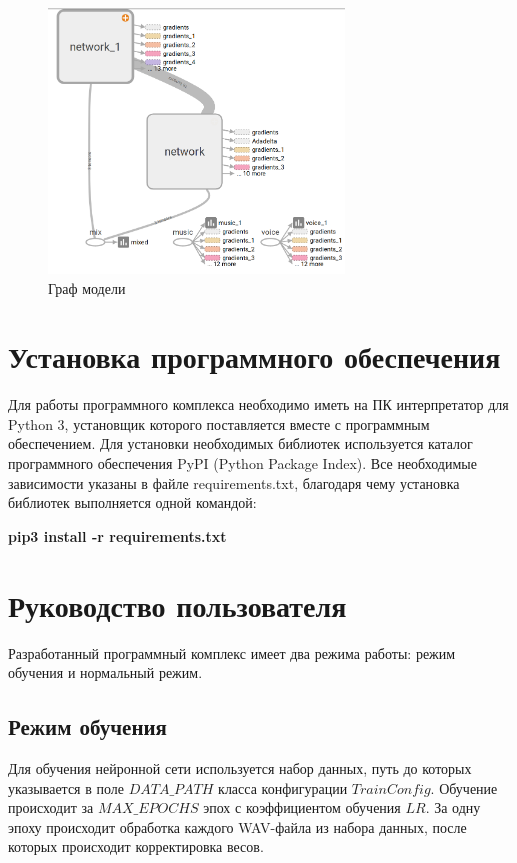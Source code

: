 \begin{figure}
	\centering
	\includegraphics[width=0.7\textwidth]{inc/img/tensorboard-main}
	\caption{Граф модели}
	\label{imp:graph}
\end{figure}

\section{Установка программного обеспечения}

Для работы программного комплекса необходимо иметь на ПК интерпретатор для Python 3, установщик которого поставляется вместе с программным обеспечением. Для установки необходимых библиотек используется каталог программного обеспечения PyPI (Python Package Index). Все необходимые зависимости указаны в файле requirements.txt, благодаря чему установка библиотек выполняется одной командой:

\textbf{pip3 install -r requirements.txt}

\section{Руководство пользователя}

Разработанный программный комплекс имеет два режима работы: режим обучения и нормальный режим.

\subsection{Режим обучения}

Для обучения нейронной сети используется набор данных, путь до которых указывается в поле $DATA\_PATH$ класса конфигурации $TrainConfig$. Обучение происходит за $MAX\_EPOCHS$ эпох с коэффициентом обучения $LR$. За одну эпоху происходит обработка каждого WAV-файла из набора данных, после которых происходит корректировка весов.

